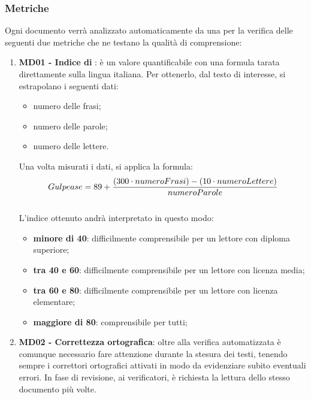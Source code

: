 	\subsubsection{Metriche}
	Ogni documento verrà analizzato automaticamente da una  per la verifica delle seguenti due metriche che ne testano la qualità di comprensione:
	\begin{enumerate}
		\item \textbf{MD01 - Indice di }: è un valore quantificabile con una formula tarata direttamente sulla lingua italiana. Per ottenerlo, dal testo di interesse, si estrapolano i seguenti dati:
		\begin{itemize}
			\item numero delle frasi;
			\item numero delle parole;
			\item numero delle lettere.
		\end{itemize}
		Una volta misurati i dati, si applica la formula:
		\begin{equation}\label{Formula per il calcolo dell'indice di Gulpease}
		Gulpease = 89 + {{(300 \cdot numeroFrasi)} - {(10 \cdot numeroLettere)} \over {numeroParole}}
		\end{equation}
		\\L'indice ottenuto andrà interpretato in questo modo:
		\begin{itemize}
			\item \textbf{minore di 40}: difficilmente comprensibile per un lettore con diploma superiore;
			\item \textbf{tra 40 e 60}: difficilmente comprensibile per un lettore con licenza media;
			\item \textbf{tra 60 e 80}: difficilmente comprensibile per un lettore con licenza elementare;
			\item \textbf{maggiore di 80}: comprensibile per tutti;
		\end{itemize}
		\item \textbf{MD02 - Correttezza ortografica}: oltre alla verifica automatizzata è comunque necessario fare attenzione durante la stesura dei testi, tenendo sempre i correttori ortografici attivati in modo da evidenziare subito eventuali errori. In fase di revisione, ai verificatori, è richiesta la lettura dello stesso documento più volte.
	\end{enumerate}